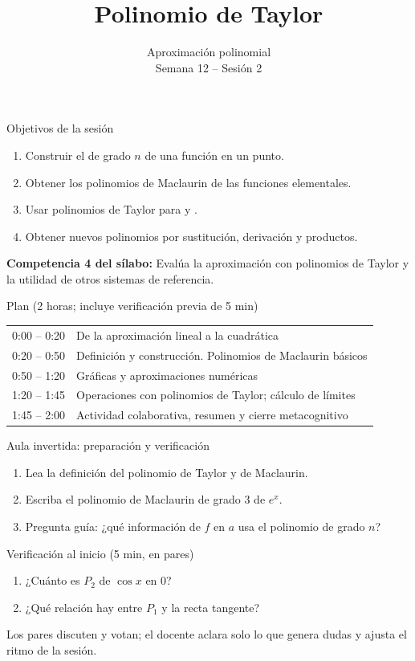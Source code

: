 \documentclass[10pt,aspectratio=169]{beamer}
\title[Polinomio de Taylor]{Polinomio de Taylor}
\subtitle{Aproximación polinomial\\[2pt]\small Semana 12 -- Sesión 2}
\begin{document}
\begin{frame}
  \titlepage
\end{frame}

\begin{frame}{Objetivos de la sesión}
  \begin{enumerate}
    \item Construir el  de grado $n$ de una función en un punto.
    \item Obtener los polinomios de Maclaurin de las funciones elementales.
    \item Usar polinomios de Taylor para  y .
    \item Obtener nuevos polinomios por sustitución, derivación y productos.
  \end{enumerate}
  \vspace{1mm}
  {\small\textbf{Competencia 4 del sílabo:} Evalúa la aproximación con polinomios de Taylor y la utilidad de otros sistemas de referencia.}
  \begin{block}{Plan (2 horas; incluye verificación previa de 5 min)}
    \begin{tabular}{ll}
      0:00 -- 0:20 & De la aproximación lineal a la cuadrática\\
      0:20 -- 0:50 & Definición y construcción. Polinomios de Maclaurin básicos\\
      0:50 -- 1:20 & Gráficas y aproximaciones numéricas\\
      1:20 -- 1:45 & Operaciones con polinomios de Taylor; cálculo de límites\\
      1:45 -- 2:00 & Actividad colaborativa, resumen y cierre metacognitivo
    \end{tabular}
  \end{block}
\end{frame}

\begin{frame}{Aula invertida: preparación y verificación}
  \small
  \begin{previa}
    \begin{enumerate}
      \item Lea la definición del polinomio de Taylor y de Maclaurin.
      \item Escriba el polinomio de Maclaurin de grado 3 de $e^x$.
      \item Pregunta guía: ¿qué información de $f$ en $a$ usa el polinomio de grado $n$?
    \end{enumerate}
  \end{previa}
  \begin{block}{Verificación al inicio (5 min, en pares)}
    \begin{enumerate}
      \item ¿Cuánto es $P_2$ de $\cos x$ en $0$?
      \item ¿Qué relación hay entre $P_1$ y la recta tangente?
    \end{enumerate}
    Los pares discuten y votan; el docente aclara solo lo que genera dudas y ajusta el ritmo de la sesión.
  \end{block}
\end{frame}
\end{document}
